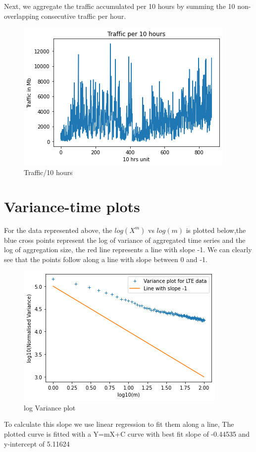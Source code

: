 Next, we aggregate the traffic accumulated per 10 hours by summing the 10 non-overlapping consecutive traffic per hour.
\begin{figure}[H]
    \centering
    \includegraphics{traffic_per_10_hours.png}
    \caption{Traffic/10 hours}
    \label{fig:traffic_per_10_hour}
\end{figure}

\section{Variance-time plots}

For the data represented above, the $log(X^{m})$ vs $log(m)$ is plotted below,the blue cross points represent the log of variance of aggregated time series and the log of aggregation size, the red line represents a line with slope -1. We can clearly see that the points follow along a line with slope between 0 and -1.
\begin{figure}[H]
    \centering
    \includegraphics{Var plot.png}
    \caption{log Variance plot}
    \label{fig:traffic_per_10_hour}
\end{figure}

To calculate this slope we use linear regression to fit them along a line, The plotted curve is fitted with a Y=mX+C curve with best fit slope of -0.44535
 and y-intercept of 5.11624
 
